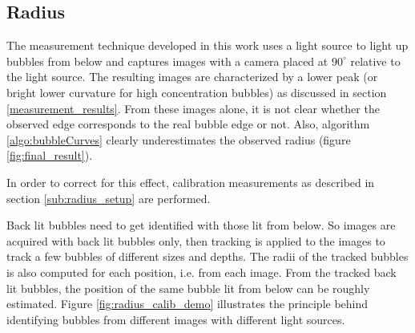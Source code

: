 			
			
			
			
		\subsection{Radius}\label{sub:radius_algorithm}
			The measurement technique developed in this work uses a light source to light up bubbles from below and captures images with a camera placed at $90^\circ$ relative to the light source. The resulting images are characterized by a lower peak (or bright lower curvature for high concentration bubbles) as discussed in section \ref{measurement_results}. From these images alone, it is not clear whether the observed edge corresponds to the real bubble edge or not. Also, algorithm \ref{algo:bubbleCurves} clearly underestimates the observed radius (figure \ref{fig:final_result}). 
			
			In order to correct for this effect, calibration measurements as described in section \ref{sub:radius_setup} are performed.
			
			Back lit bubbles need to get identified with those lit from below. So images are acquired with back lit bubbles only, then tracking is applied to the images to track a few bubbles of different sizes and depths. The radii of the tracked bubbles is also computed for each position, i.e. from each image. From the tracked back lit bubbles, the position of the same bubble lit from below can be roughly estimated. Figure \ref{fig:radius_calib_demo} illustrates the principle behind identifying bubbles from different images with different light sources. 
			
